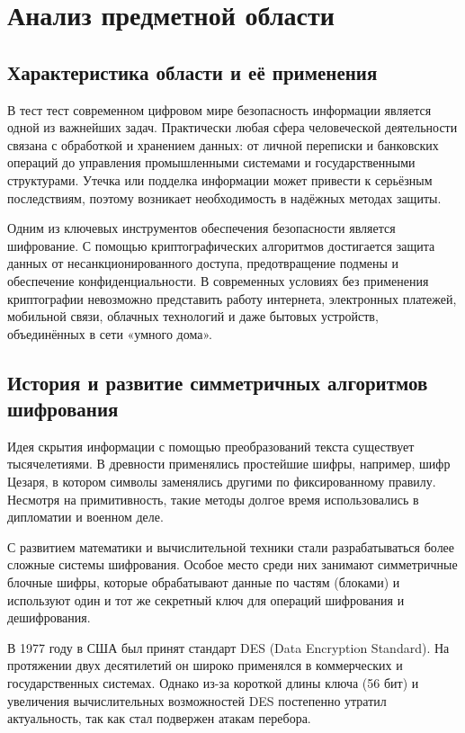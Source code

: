 \section{Анализ предметной области}
\subsection{Характеристика области и её применения}

В тест тест современном цифровом мире безопасность информации является одной из важнейших задач. Практически любая сфера человеческой деятельности связана с обработкой и хранением данных: от личной переписки и банковских операций до управления промышленными системами и государственными структурами. Утечка или подделка информации может привести к серьёзным последствиям, поэтому возникает необходимость в надёжных методах защиты.  

Одним из ключевых инструментов обеспечения безопасности является шифрование. С помощью криптографических алгоритмов достигается защита данных от несанкционированного доступа, предотвращение подмены и обеспечение конфиденциальности. В современных условиях без применения криптографии невозможно представить работу интернета, электронных платежей, мобильной связи, облачных технологий и даже бытовых устройств, объединённых в сети «умного дома».  

\subsection{История и развитие симметричных алгоритмов шифрования}

Идея скрытия информации с помощью преобразований текста существует тысячелетиями. В древности применялись простейшие шифры, например, шифр Цезаря, в котором символы заменялись другими по фиксированному правилу. Несмотря на примитивность, такие методы долгое время использовались в дипломатии и военном деле.  

С развитием математики и вычислительной техники стали разрабатываться более сложные системы шифрования. Особое место среди них занимают симметричные блочные шифры, которые обрабатывают данные по частям (блоками) и используют один и тот же секретный ключ для операций шифрования и дешифрования.  

В 1977 году в США был принят стандарт DES (Data Encryption Standard). На протяжении двух десятилетий он широко применялся в коммерческих и государственных системах. Однако из-за короткой длины ключа (56 бит) и увеличения вычислительных возможностей DES постепенно утратил актуальность, так как стал подвержен атакам перебора.  

